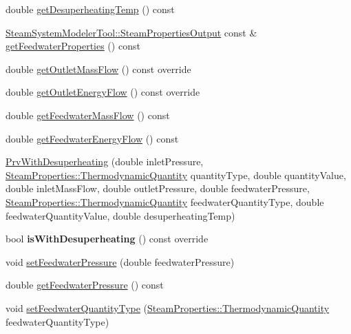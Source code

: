 \begin{DoxyCompactItemize}
\item 
double \hyperlink{class_prv_with_desuperheating_af334a9ff9a14d110cb2851a76d5d84fb}{get\+Desuperheating\+Temp} () const
\item 
\hyperlink{struct_steam_system_modeler_tool_1_1_steam_properties_output}{Steam\+System\+Modeler\+Tool\+::\+Steam\+Properties\+Output} const  \& \hyperlink{class_prv_with_desuperheating_a8f4594109bda9bc4030c23cee9841fa8}{get\+Feedwater\+Properties} () const
\item 
double \hyperlink{class_prv_with_desuperheating_a76c03ff2f54c85cd0c80543f23549635}{get\+Outlet\+Mass\+Flow} () const override
\item 
double \hyperlink{class_prv_with_desuperheating_a2394fb62e4fc85252fc4eb15f08e9f1e}{get\+Outlet\+Energy\+Flow} () const override
\item 
double \hyperlink{class_prv_with_desuperheating_a9bd8ee7d5b563110a7279102352b8f4d}{get\+Feedwater\+Mass\+Flow} () const
\item 
double \hyperlink{class_prv_with_desuperheating_a42945a77fcdbaf1e1844c444c696f8b0}{get\+Feedwater\+Energy\+Flow} () const
\item 
\hyperlink{class_prv_with_desuperheating_adfd7f6866e8b953dcc41e51bb5b31b58}{Prv\+With\+Desuperheating} (double inlet\+Pressure, \hyperlink{class_steam_properties_ae0294bedf7d178c2d8fb6aed0f62fbff}{Steam\+Properties\+::\+Thermodynamic\+Quantity} quantity\+Type, double quantity\+Value, double inlet\+Mass\+Flow, double outlet\+Pressure, double feedwater\+Pressure, \hyperlink{class_steam_properties_ae0294bedf7d178c2d8fb6aed0f62fbff}{Steam\+Properties\+::\+Thermodynamic\+Quantity} feedwater\+Quantity\+Type, double feedwater\+Quantity\+Value, double desuperheating\+Temp)
\item 
\mbox{\label{class_prv_with_desuperheating_ae7c08df31c2cc21077cbaff390261ac7}} 
bool {\bfseries is\+With\+Desuperheating} () const override
\item 
void \hyperlink{class_prv_with_desuperheating_a8494ebf87e5bd834f621b0c7ca257fbe}{set\+Feedwater\+Pressure} (double feedwater\+Pressure)
\item 
double \hyperlink{class_prv_with_desuperheating_a260bbe19272694af509fb408a821b041}{get\+Feedwater\+Pressure} () const
\item 
void \hyperlink{class_prv_with_desuperheating_a3efaf028d1e6b8349a9e064605cc8d7a}{set\+Feedwater\+Quantity\+Type} (\hyperlink{class_steam_properties_ae0294bedf7d178c2d8fb6aed0f62fbff}{Steam\+Properties\+::\+Thermodynamic\+Quantity} feedwater\+Quantity\+Type)

\end{DoxyCompactItemize}
